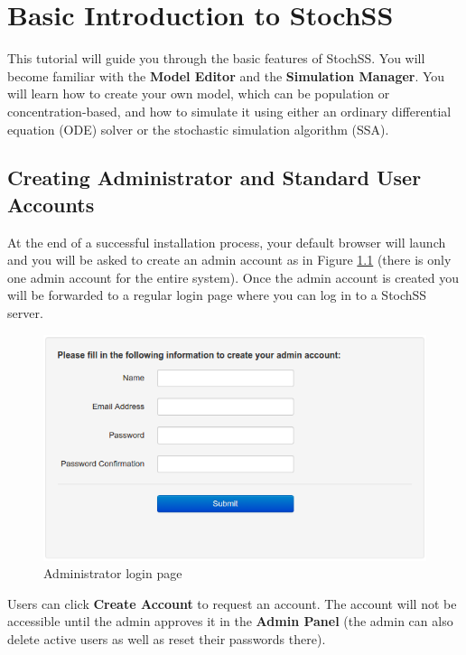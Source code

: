 \chapter{Basic Introduction to StochSS}
\label{chapter1}
This tutorial will guide you through the basic features of StochSS. You will become familiar with the \textbf{Model Editor} and the \textbf{Simulation Manager}. You will learn how to create your own model, which can be population or concentration-based, and how to simulate it using either an ordinary differential equation (ODE) solver or the stochastic simulation algorithm (SSA).

\section{\label{sec:acc} Creating Administrator and Standard User Accounts}
At the end of a successful installation process, your default browser will launch and you will be asked to create an admin account as in Figure \ref{fig:admin} (there is only one admin account for the entire system).
Once the admin account is created you will be forwarded to a regular login page where you can log in to a StochSS server.

\begin{figure}[!htb]
\centering
\includegraphics[scale=0.64]{T1/admin.png}
\caption{Administrator login page}
\label{fig:admin}
\end{figure}

Users can click \textbf{Create Account} to request an account.
The account will not be accessible until the admin approves it in the \textbf{Admin Panel} (the admin can also delete active users as well as reset their passwords there).
%

